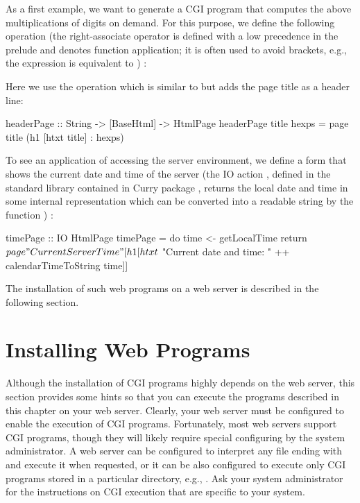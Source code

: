 As a first example, we want to generate a CGI program
that computes the above multiplications of digits on demand.
For this purpose, we define the following operation 
(the right-associate operator \ccode{\$}\pindex{\$} is
defined with a low precedence
in the prelude and denotes function application; it is often used to avoid
brackets, e.g., the expression  is equivalent to
)
:
%
%
Here we use the operation  which is similar to 
but adds the page title as a header line:
%
\begin{curry}
headerPage :: String -> [BaseHtml] -> HtmlPage
headerPage title hexps = page title (h1 [htxt title] : hexps)
\end{curry}
%
To see an application of accessing the server environment,
we define a form that shows the current date and time of the server
(the IO action ,
defined in the standard library  contained
in Curry package , returns the local
date and time in some internal representation which can be
converted into a readable string by the function
)
:
\begin{curry}
timePage :: IO HtmlPage
timePage = do
 time <- getLocalTime
 return $ page "Current Server Time"
   [h1 [htxt $ "Current date and time: " ++ calendarTimeToString time]]
\end{curry}
%
The installation of such web programs on a web server is described
in the following section.

           
\section{Installing Web Programs}
\label{sec-cgi-install}

Although the installation of CGI programs highly depends on the web server,
this section provides some hints so that you can
execute the programs described in this chapter on your web server.
Clearly, your web server must be configured to enable the execution of
CGI programs. Fortunately, most web servers support CGI programs, though
they will likely require special configuring by the system administrator.
A web server can be configured to interpret any file ending
with  and execute it when requested, or it
can be also configured to execute only CGI programs stored
in a particular directory, e.g., .
Ask your system administrator for the instructions
on CGI execution that are specific to your system.


